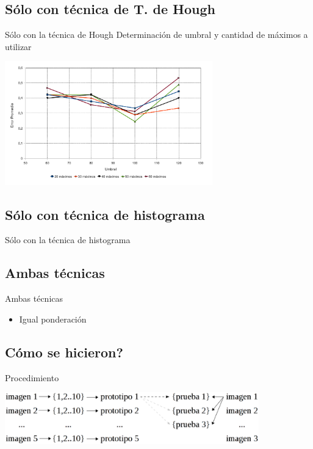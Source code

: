 \documentclass[spanish]{beamer}
\begin{document}
\subsection{Sólo con técnica de T. de Hough}
\begin{frame}{Sólo con la técnica de Hough}
Determinación de umbral y cantidad de máximos a utilizar
  \begin{center}
    \includegraphics[width=9cm]{../diagramas/estadistica_noche_iguales}
  \end{center}
\end{frame}

\subsection{Sólo con técnica de histograma}
\begin{frame}{Sólo con la técnica de histograma}
\end{frame}

\subsection{Ambas técnicas}
\begin{frame}{Ambas técnicas}
  \begin{itemize}
  \item Igual ponderación
  \end{itemize}
\end{frame}

\subsection{Cómo se hicieron?}
\begin{frame}{Procedimiento}
  \begin{center}
    \includegraphics[width=11cm]{../diagramas/proceso_pruebas}
  \end{center}
\end{frame}
\end{document}
